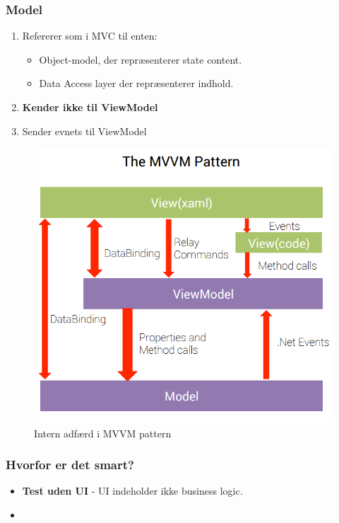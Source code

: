 \subsubsection{Model}
\begin{enumerate}
	\item Refererer som i MVC til enten:
	\begin{itemize}
		\item Object-model, der repræsenterer state content.
		\item Data Access layer der repræsenterer indhold.
	\end{itemize}
	\item \textbf{Kender ikke til ViewModel}
	\item Sender evnets til ViewModel
\end{enumerate}

\begin{figure}[h]
\centering
\includegraphics[width=0.7\linewidth]{figs/MVVM/mvvmPatternComplex}
\caption{Intern adfærd i MVVM pattern}
\label{fig:mvvmPatternComplex}
\end{figure}


\subsubsection{Hvorfor er det smart?}

\begin{itemize}
	\item \textbf{Test uden UI} - UI indeholder ikke business logic.
	\item 
\end{itemize}




